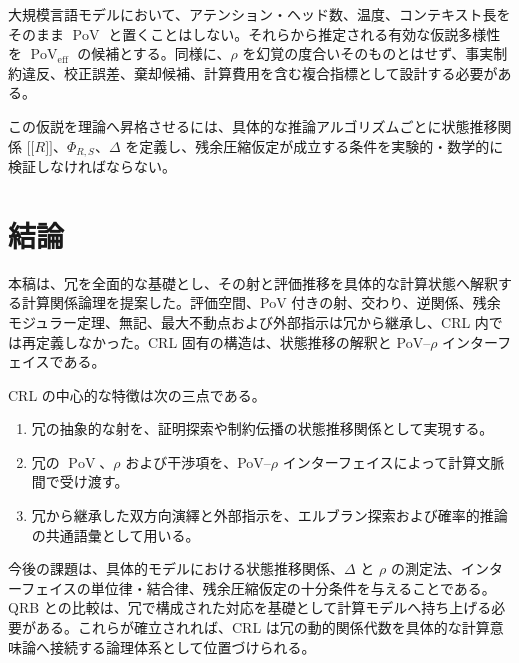 \documentclass[a4paper,11pt]{ltjsarticle}
\theoremstyle{definition}
\theoremstyle{plain}
\newcommand{\PoV}{\operatorname{PoV}}
\newcommand{\sem}[1]{\mathopen{[\![}#1\mathclose{]\!]}}
\begin{document}
大規模言語モデルにおいて、アテンション・ヘッド数、温度、コンテキスト長をそのまま $\PoV$ と置くことはしない。それらから推定される有効な仮説多様性を $\PoV_{\mathrm{eff}}$ の候補とする。同様に、$\rho$ を幻覚の度合いそのものとはせず、事実制約違反、校正誤差、棄却候補、計算費用を含む複合指標として設計する必要がある。

この仮説を理論へ昇格させるには、具体的な推論アルゴリズムごとに状態推移関係 $\sem{R}$、$\Phi_{R,S}$、$\Delta$ を定義し、残余圧縮仮定が成立する条件を実験的・数学的に検証しなければならない。

\section{結論}

本稿は、冗を全面的な基礎とし、その射と評価推移を具体的な計算状態へ解釈する計算関係論理を提案した。評価空間、PoV 付きの射、交わり、逆関係、残余モジュラー定理、無記、最大不動点および外部指示は冗から継承し、CRL 内では再定義しなかった。CRL 固有の構造は、状態推移の解釈と PoV--$\rho$ インターフェイスである。

CRL の中心的な特徴は次の三点である。
\begin{enumerate}
 \item 冗の抽象的な射を、証明探索や制約伝播の状態推移関係として実現する。
 \item 冗の $\PoV$、$\rho$ および干渉項を、PoV--$\rho$ インターフェイスによって計算文脈間で受け渡す。
 \item 冗から継承した双方向演繹と外部指示を、エルブラン探索および確率的推論の共通語彙として用いる。
\end{enumerate}

今後の課題は、具体的モデルにおける状態推移関係、$\Delta$ と $\rho$ の測定法、インターフェイスの単位律・結合律、残余圧縮仮定の十分条件を与えることである。QRB との比較は、冗で構成された対応を基礎として計算モデルへ持ち上げる必要がある。これらが確立されれば、CRL は冗の動的関係代数を具体的な計算意味論へ接続する論理体系として位置づけられる。



\end{document}
